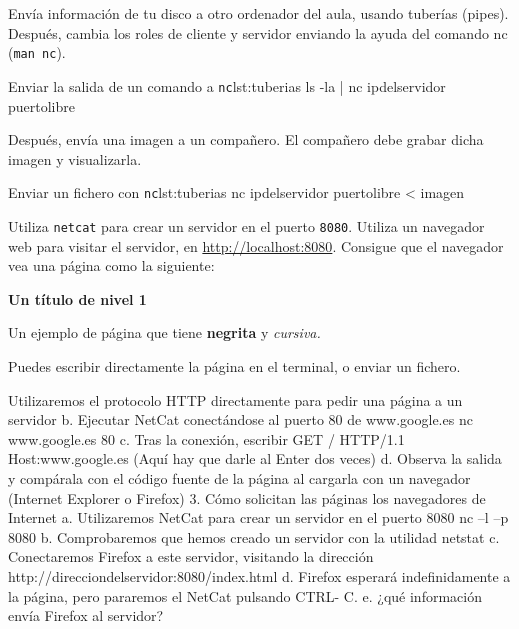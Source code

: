 \begin{homeworkProblem}
  Envía información de tu disco a otro ordenador del aula, usando tuberías (pipes). Después, cambia los roles de cliente y servidor enviando la ayuda del comando nc (\texttt{man nc}).

  
  \begin{listadoshell}{Enviar la salida de un comando a \texttt{nc}}{lst:tuberias}
    ls -la | nc ipdelservidor puertolibre
  \end{listadoshell}

  Después, envía una imagen a un compañero. El compañero debe grabar dicha imagen y visualizarla.

  \begin{listadoshell}{Enviar un fichero con \texttt{nc}}{lst:tuberias}
    nc ipdelservidor puertolibre < imagen
  \end{listadoshell}
  

\end{homeworkProblem}
\begin{homeworkProblem}

  Utiliza \texttt{netcat} para crear un servidor en el puerto \texttt{8080}. Utiliza un navegador web para visitar el servidor, en \url{http://localhost:8080}. Consigue que el navegador vea una página como la siguiente:

  \begin{cuadrito}
    {\large \textbf{Un título de nivel 1}}
    
    Un ejemplo de página que tiene \textbf{negrita} y \textit{cursiva.}
  \end{cuadrito}

  Puedes escribir directamente la página en el terminal, o enviar un fichero.
  
\end{homeworkProblem}


\begin{homeworkProblem}
  Utilizaremos el protocolo HTTP directamente para pedir una página a un servidor
  b. Ejecutar NetCat conectándose al puerto 80 de www.google.es
  nc www.google.es 80
  c. Tras la conexión, escribir
  GET / HTTP/1.1
  Host:www.google.es
  (Aquí hay que darle al Enter dos veces)
  d. Observa la salida y compárala con el código fuente de la página al cargarla con un
  navegador (Internet Explorer o Firefox)
  3. Cómo solicitan las páginas los navegadores de Internet
  a. Utilizaremos NetCat para crear un servidor en el puerto 8080
  nc –l –p 8080
  b. Comprobaremos que hemos creado un servidor con la utilidad netstat
  c. Conectaremos Firefox a este servidor, visitando la dirección
  http://direcciondelservidor:8080/index.html
  d. Firefox esperará indefinidamente a la página, pero pararemos el NetCat pulsando CTRL-
  C.
  e. ¿qué información envía Firefox al servidor?

\end{homeworkProblem}




